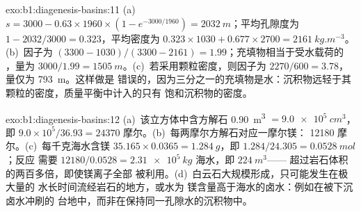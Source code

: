 \begin{solution}{exo:b1:diagenesis-basins:11}
(a)~$s = 3000 - 0.63\times1960\times(1 - e^{-3000/1960}) = \qty{2032}{m}$；平均孔隙度为
$1 - 2032/3000 = \num{0.323}$，平均密度为
$0.323\times1030 + 0.677\times2700 = \qty{2161}{kg.m^{-3}}$。(b)~因子为
$(3300 - 1030)/(3300 - 2161) = \num{1.99}$；充填物相当于受水载荷的
，量为 $3000/1.99 = \qty{1505}{m}$。(c)~若采用颗粒密度，则因子为
$2270/600 = \num{3.78}$，量仅为 \qty{793}{m}。这样做是
错误的，因为三分之一的充填物是水：沉积物远轻于其
颗粒的密度，质量平衡中计入的只有
饱和沉积物的密度。
\end{solution}

\begin{solution}{exo:b1:diagenesis-basins:12}
(a)~该立方体中含方解石 \qty{0.90}{m^3} $= \qty{9.0e5}{cm^3}$，即
$9.0\times10^5/36.93 = \num{24370}$ 摩尔。(b)~每两摩尔方解石对应一摩尔镁：
\num{12180} 摩尔。(c)~每千克海水含镁 $35.165\times0.0365 =
\qty{1.284}{g}$，即 $1.284/24.305 = \qty{0.0528}{mol}$；反应
需要 $12180/0.0528 = \qty{2.31e5}{kg}$ 海水，即 $\qty{224}{m^3}$——
超过岩石体积的两百多倍，即使镁离子全部
被利用。(d)~白云石大规模形成，只可能发生在极大量的
水长时间流经岩石的地方，或水为
镁含量高于海水的卤水：例如在被下沉卤水冲刷的
台地中，而非在保持同一孔隙水的沉积物中。
\end{solution}


